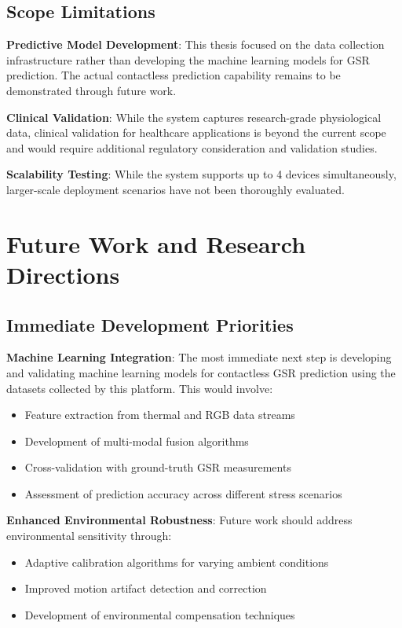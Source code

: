 \subsection{Scope Limitations}

\textbf{Predictive Model Development}: This thesis focused on the data collection infrastructure rather than developing the machine learning models for GSR prediction. The actual contactless prediction capability remains to be demonstrated through future work.

\textbf{Clinical Validation}: While the system captures research-grade physiological data, clinical validation for healthcare applications is beyond the current scope and would require additional regulatory consideration and validation studies.

\textbf{Scalability Testing}: While the system supports up to 4 devices simultaneously, larger-scale deployment scenarios have not been thoroughly evaluated.

\section{Future Work and Research Directions}

\subsection{Immediate Development Priorities}

\textbf{Machine Learning Integration}: The most immediate next step is developing and validating machine learning models for contactless GSR prediction using the datasets collected by this platform. This would involve:

\begin{itemize}
\item Feature extraction from thermal and RGB data streams
\item Development of multi-modal fusion algorithms
\item Cross-validation with ground-truth GSR measurements
\item Assessment of prediction accuracy across different stress scenarios
\end{itemize}

\textbf{Enhanced Environmental Robustness}: Future work should address environmental sensitivity through:

\begin{itemize}
\item Adaptive calibration algorithms for varying ambient conditions
\item Improved motion artifact detection and correction
\item Development of environmental compensation techniques
\end{itemize}

